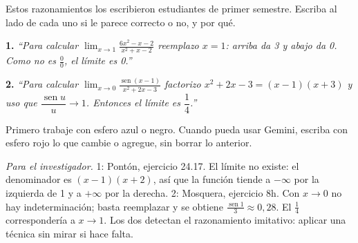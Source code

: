 \documentclass[11pt,letterpaper]{article}
\DeclareMathOperator{\seno}{sen}
\begin{document}
\bigskip
Estos razonamientos los escribieron estudiantes de primer semestre. Escriba al lado de cada uno si le parece correcto o no, y por qué.

\bigskip
\textbf{1.} \emph{``Para calcular $\displaystyle\lim_{x\to1}\frac{6x^2-x-2}{x^2+x-2}$ reemplazo $x=1$: arriba da 3 y abajo da 0. Como no es $\frac00$, el límite es 0.''}

\vspace{5.5cm}

\textbf{2.} \emph{``Para calcular $\displaystyle\lim_{x\to0}\frac{\seno(x-1)}{x^2+2x-3}$ factorizo $x^2+2x-3=(x-1)(x+3)$ y uso que $\dfrac{\seno u}{u}\to1$. Entonces el límite es $\dfrac14$.''}

\vspace{5.5cm}

{\small Primero trabaje con esfero azul o negro. Cuando pueda usar Gemini, escriba con esfero rojo lo que cambie o agregue, sin borrar lo anterior.}

\bigskip
{\footnotesize\textit{Para el investigador.} 1: Pontón, ejercicio 24.17. El límite no existe: el denominador es $(x-1)(x+2)$, así que la función tiende a $-\infty$ por la izquierda de 1 y a $+\infty$ por la derecha. 2: Mosquera, ejercicio 8h. Con $x\to0$ no hay indeterminación; basta reemplazar y se obtiene $\frac{\seno 1}{3}\approx0{,}28$. El $\frac14$ correspondería a $x\to1$. Los dos detectan el razonamiento imitativo: aplicar una técnica sin mirar si hace falta.}
\end{document}
